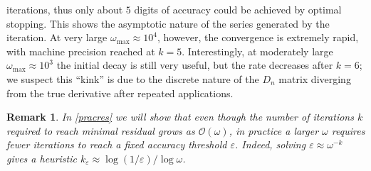 \documentclass[10pt]{article}
\newcommand{\bigO}{{\mathcal O}}
\newtheorem{rmk}[thm]{Remark}
\newcommand{\om}{\omega}
\begin{document}
iterations, thus only about $5$ digits of accuracy could be achieved
by optimal stopping.
This shows the asymptotic nature of the series generated by the iteration.
At very large $\om_{\text{max}} \approx 10^4$, however, the
convergence is extremely rapid, with machine precision reached at $k=5$.
Interestingly, at moderately large $\om_{\text{max}} \approx 10^3$ the initial decay is
still very useful, but the rate decreases after $k=6$; we
suspect this ``kink'' is due to
the discrete nature of the $D_n$ matrix diverging from
the true derivative after repeated applications.
%
\begin{rmk}\label{fewer}  
In \cref{pracres} we will show that even though the number of iterations $k$
required to reach minimal residual grows as $\bigO(\om)$, in
practice a larger $\om$ requires \emph{fewer} iterations to reach a fixed
accuracy threshold $\varepsilon$.
Indeed, solving $\varepsilon\approx \om^{-k}$ gives a heuristic
$k_\varepsilon \approx \log(1/\varepsilon)/\log \om$.
\end{rmk}                    
\end{document}

